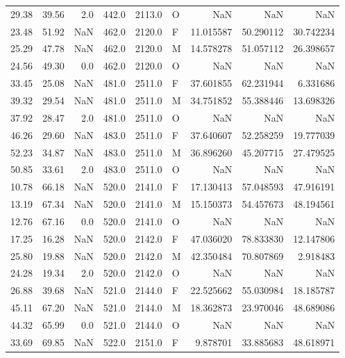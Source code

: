\begin{table}
\begin{tabular}{rrrrrlrrr}
29.38 &  39.56 &      2.0 &  442.0 & 2113.0 &      O &       NaN &       NaN &       NaN \\
23.48 &  51.92 &      NaN &  462.0 & 2120.0 &      F & 11.015587 & 50.290112 & 30.742234 \\
25.29 &  47.78 &      NaN &  462.0 & 2120.0 &      M & 14.578278 & 51.057112 & 26.398657 \\
24.56 &  49.30 &      0.0 &  462.0 & 2120.0 &      O &       NaN &       NaN &       NaN \\
33.45 &  25.08 &      NaN &  481.0 & 2511.0 &      F & 37.601855 & 62.231944 &  6.331686 \\
39.32 &  29.54 &      NaN &  481.0 & 2511.0 &      M & 34.751852 & 55.388446 & 13.698326 \\
37.92 &  28.47 &      2.0 &  481.0 & 2511.0 &      O &       NaN &       NaN &       NaN \\
46.26 &  29.60 &      NaN &  483.0 & 2511.0 &      F & 37.640607 & 52.258259 & 19.777039 \\
52.23 &  34.87 &      NaN &  483.0 & 2511.0 &      M & 36.896260 & 45.207715 & 27.479525 \\
50.85 &  33.61 &      2.0 &  483.0 & 2511.0 &      O &       NaN &       NaN &       NaN \\
10.78 &  66.18 &      NaN &  520.0 & 2141.0 &      F & 17.130413 & 57.048593 & 47.916191 \\
13.19 &  67.34 &      NaN &  520.0 & 2141.0 &      M & 15.150373 & 54.457673 & 48.194561 \\
12.76 &  67.16 &      0.0 &  520.0 & 2141.0 &      O &       NaN &       NaN &       NaN \\
17.25 &  16.28 &      NaN &  520.0 & 2142.0 &      F & 47.036020 & 78.833830 & 12.147806 \\
25.80 &  19.88 &      NaN &  520.0 & 2142.0 &      M & 42.350484 & 70.807869 &  2.918483 \\
24.28 &  19.34 &      2.0 &  520.0 & 2142.0 &      O &       NaN &       NaN &       NaN \\
26.88 &  39.68 &      NaN &  521.0 & 2144.0 &      F & 22.525662 & 55.030984 & 18.185787 \\
45.11 &  67.20 &      NaN &  521.0 & 2144.0 &      M & 18.362873 & 23.970046 & 48.689086 \\
44.32 &  65.99 &      0.0 &  521.0 & 2144.0 &      O &       NaN &       NaN &       NaN \\
33.69 &  69.85 &      NaN &  522.0 & 2151.0 &      F &  9.878701 & 33.885683 & 48.618971 \\

\end{tabular}
\end{table}
